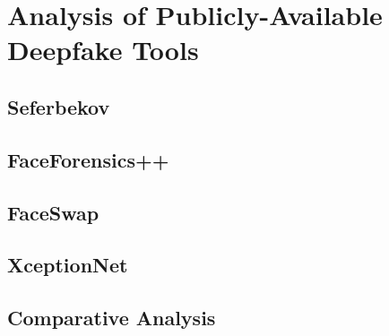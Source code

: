 
\chapter{Analysis of Publicly-Available Deepfake Tools}\label{chapter:tools}

\section{Seferbekov}\label{chapter:seferbekov}
\section{FaceForensics++}\label{chapter:faceforensics}
\section{FaceSwap}\label{chapter:faceswap}
\section{XceptionNet}\label{chapter:xceptionnet}
\section{Comparative Analysis}\label{chapter:analysis} 
